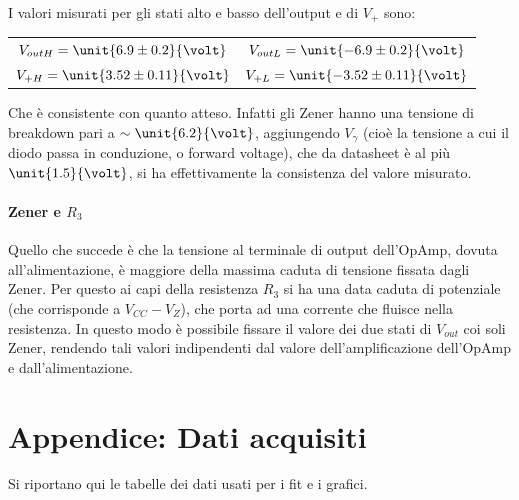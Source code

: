 \documentclass[10pt,a4paper]{article}
\begin{document}
I valori misurati per gli stati alto e basso dell'output e di $V_+$ sono:

\begin{table}[H]
	\centering
	\begin{tabular}{cc}
        $ V_{out H} = \unit{6.9 \pm 0.2}{\volt}$  & $V_{out L} = \unit{-6.9 \pm 0.2}{\volt}$\\
        $ V_{+ H} = \unit{3.52 \pm 0.11}{\volt}$  & $V_{+ L} = \unit{-3.52 \pm 0.11}{\volt}$
	\end{tabular}
\end{table}

Che è consistente con quanto atteso. Infatti gli Zener hanno una tensione di breakdown pari a $\sim \unit{6.2}{\volt}$, aggiungendo $V_\gamma$ (cioè la tensione a cui il diodo passa in conduzione, o forward voltage), che da datasheet è al più $\unit{1.5}{\volt}$, si ha effettivamente la consistenza del valore misurato.

\paragraph{Zener e $R_3$} Quello che succede è che la tensione al terminale di output dell'OpAmp, dovuta all'alimentazione, è maggiore della massima caduta di tensione fissata dagli Zener. Per questo ai capi della resistenza $R_3$ si ha una data caduta di potenziale (che corrisponde a $V_{CC}-V_Z$), che porta ad una corrente che fluisce nella resistenza. In questo modo è possibile fissare il valore dei due stati di $V_{out}$ coi soli Zener, rendendo tali valori indipendenti dal valore dell'amplificazione dell'OpAmp e dall'alimentazione.

\pagebreak
\section{Appendice: Dati acquisiti}
Si riportano qui le tabelle dei dati usati per i fit e i grafici.

\end{document}
